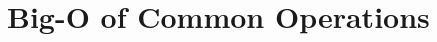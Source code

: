 \documentclass[aspectratio=169,xcolor=dvipsnames]{beamer}
\begin{document}
\section{Big-O of Common Operations}



\end{document}
